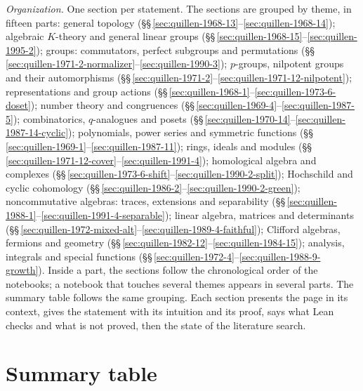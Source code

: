 \documentclass[11pt]{article}
\theoremstyle{plain}
\theoremstyle{definition}
\theoremstyle{remark}
\renewcommand{\_}{\bkunderscore\allowbreak}
\begin{document}
\emph{Organization.} One section per statement. The sections are grouped by theme, in fifteen parts: general topology (\S\S\,\ref{sec:quillen-1968-13}--\ref{sec:quillen-1968-14}); algebraic $K$-theory and general linear groups (\S\S\,\ref{sec:quillen-1968-15}--\ref{sec:quillen-1995-2}); groups: commutators, perfect subgroups and permutations (\S\S\,\ref{sec:quillen-1971-2-normalizer}--\ref{sec:quillen-1990-3}); $p$-groups, nilpotent groups and their automorphisms (\S\S\,\ref{sec:quillen-1971-2}--\ref{sec:quillen-1971-12-nilpotent}); representations and group actions (\S\S\,\ref{sec:quillen-1968-1}--\ref{sec:quillen-1973-6-doset}); number theory and congruences (\S\S\,\ref{sec:quillen-1969-4}--\ref{sec:quillen-1987-5}); combinatorics, $q$-analogues and posets (\S\S\,\ref{sec:quillen-1970-14}--\ref{sec:quillen-1987-14-cyclic}); polynomials, power series and symmetric functions (\S\S\,\ref{sec:quillen-1969-1}--\ref{sec:quillen-1987-11}); rings, ideals and modules (\S\S\,\ref{sec:quillen-1971-12-cover}--\ref{sec:quillen-1991-4}); homological algebra and complexes (\S\S\,\ref{sec:quillen-1973-6-shift}--\ref{sec:quillen-1990-2-split}); Hochschild and cyclic cohomology (\S\S\,\ref{sec:quillen-1986-2}--\ref{sec:quillen-1990-2-green}); noncommutative algebras: traces, extensions and separability (\S\S\,\ref{sec:quillen-1988-1}--\ref{sec:quillen-1991-4-separable}); linear algebra, matrices and determinants (\S\S\,\ref{sec:quillen-1972-mixed-alt}--\ref{sec:quillen-1989-4-faithful}); Clifford algebras, fermions and geometry (\S\S\,\ref{sec:quillen-1982-12}--\ref{sec:quillen-1984-15}); analysis, integrals and special functions (\S\S\,\ref{sec:quillen-1972-4}--\ref{sec:quillen-1988-9-growth}). Inside a part, the sections follow the chronological order of the notebooks; a notebook that touches several themes appears in several parts. The summary table follows the same grouping. Each section presents the page in its context, gives the statement with its intuition and its proof, says what Lean checks and what is not proved, then the state of the literature search.

\section*{Summary table}
\end{document}
